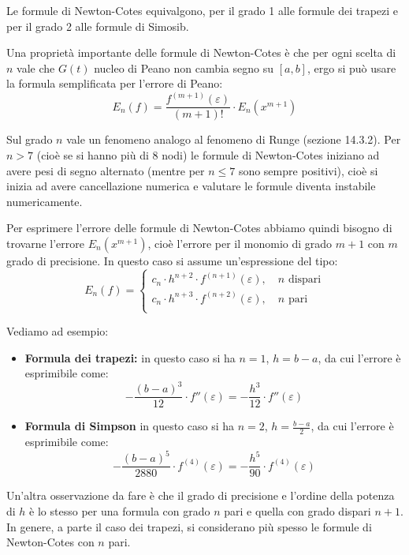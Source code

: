 \documentclass[a4paper,11pt]{article}
\begin{document}
Le formule di Newton-Cotes equivalgono, per il grado 1 alle formule dei trapezi e per il grado 2 alle formule di Simosib.

Una proprietà importante delle formule di Newton-Cotes è che per ogni scelta di $n$ vale che $G(t)$ nucleo di Peano non cambia segno su $[a ,b]$, ergo si può usare la formula semplificata per l'errore di Peano:
$$
E_n(f) = \frac{f^{(m + 1)} (\varepsilon)}{(m + 1)!} \cdot E_n(x^{m + 1})
$$

Sul grado $n$ vale un fenomeno analogo al fenomeno di Runge (sezione 14.3.2).
Per $n > 7$ (cioè se si hanno più di $8$ nodi) le formule di Newton-Cotes iniziano ad avere pesi di segno alternato (mentre per $n \leq 7$ sono sempre positivi), cioè si inizia ad avere cancellazione numerica e valutare le formule diventa instabile numericamente.

\par\smallskip

Per esprimere l'errore delle formule di Newton-Cotes abbiamo quindi bisogno di trovarne l'errore $E_n(x^{m + 1})$, cioè l'errore per il monomio di grado $m + 1$ con $m$ grado di precisione.
In questo caso si assume un'espressione del tipo:
$$
E_n(f) =
\begin{cases}
	c_n \cdot h^{n + 2} \cdot f^{(n + 1)} (\varepsilon), \quad n \text{ dispari} \\			
	c_n \cdot h^{n + 3} \cdot f^{(n + 2)} (\varepsilon), \quad n \text{ pari} \\			
\end{cases}
$$

Vediamo ad esempio:
\begin{itemize}
	\item \textbf{Formula dei trapezi:} in questo caso si ha $n = 1$, $h = b - a$, da cui l'errore è esprimibile come:
		$$
		- \frac{(b - a)^3}{12} \cdot f''(\varepsilon) = -\frac{h^3}{12} \cdot f''(\varepsilon)
		$$
	\item \textbf{Formula di Simpson} in questo caso si ha $n = 2$, $h = \frac{b - a}{2}$, da cui l'errore è esprimibile come:
		$$
		- \frac{(b - a)^5}{2880} \cdot f^{(4)}(\varepsilon) = -\frac{h^5}{90} \cdot f^{(4)}(\varepsilon)
		$$
\end{itemize}

Un'altra osservazione da fare è che il grado di precisione e l'ordine della potenza di $h$ è lo stesso per una formula con grado $n$ pari e quella con grado dispari $n + 1$.
In genere, a parte il caso dei trapezi, si considerano più spesso le formule di Newton-Cotes con $n$ pari.
\end{document}
